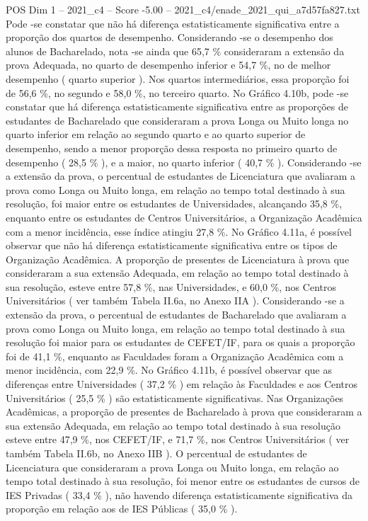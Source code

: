 \begin{textsample}{POS Dim 1 – 2021\_c4 – Score -5.00 – 2021\_c4/enade\_2021\_qui\_a7d57fa827.txt}
Pode -se constatar que não há diferença estatisticamente significativa entre a proporção dos quartos de desempenho.
Considerando -se o desempenho dos alunos de Bacharelado, nota -se ainda que 65,7 \% consideraram a extensão da prova Adequada, no quarto de desempenho inferior e 54,7 \%, no de melhor desempenho ( quarto superior ).
Nos quartos intermediários, essa proporção foi de 56,6 \%, no segundo e 58,0 \%, no terceiro quarto.
No Gráfico 4.10b, pode -se constatar que há diferença estatisticamente significativa entre as proporções de estudantes de Bacharelado que consideraram a prova Longa ou Muito longa no quarto inferior em relação ao segundo quarto e ao quarto superior de desempenho, sendo a menor proporção dessa resposta no primeiro quarto de desempenho ( 28,5 \% ), e a maior, no quarto inferior ( 40,7 \% ).
Considerando -se a extensão da prova, o percentual de estudantes de Licenciatura que avaliaram a prova como Longa ou Muito longa, em relação ao tempo total destinado à sua resolução, foi maior entre os estudantes de Universidades, alcançando 35,8 \%, enquanto entre os estudantes de Centros Universitários, a Organização Acadêmica com a menor incidência, esse índice atingiu 27,8 \%.
No Gráfico 4.11a, é possível observar que não há diferença estatisticamente significativa entre os tipos de Organização Acadêmica.
A proporção de presentes de Licenciatura à prova que consideraram a sua extensão Adequada, em relação ao tempo total destinado à sua resolução, esteve entre 57,8 \%, nas Universidades, e 60,0 \%, nos Centros Universitários ( ver também Tabela II.6a, no Anexo IIA ).
Considerando -se a extensão da prova, o percentual de estudantes de Bacharelado que avaliaram a prova como Longa ou Muito longa, em relação ao tempo total destinado à sua resolução foi maior para os estudantes de CEFET/IF, para os quais a proporção foi de 41,1 \%, enquanto as Faculdades foram a Organização Acadêmica com a menor incidência, com 22,9 \%.
No Gráfico 4.11b, é possível observar que as diferenças entre Universidades ( 37,2 \% ) em relação às Faculdades e aos Centros Universitários ( 25,5 \% ) são estatisticamente significativas.
Nas Organizações Acadêmicas, a proporção de presentes de Bacharelado à prova que consideraram a sua extensão Adequada, em relação ao tempo total destinado à sua resolução esteve entre 47,9 \%, nos CEFET/IF, e 71,7 \%, nos Centros Universitários ( ver também Tabela II.6b, no Anexo IIB ).
O percentual de estudantes de Licenciatura que consideraram a prova Longa ou Muito longa, em relação ao tempo total destinado à sua resolução, foi menor entre os estudantes de cursos de IES Privadas ( 33,4 \% ), não havendo diferença estatisticamente significativa da proporção em relação aos de IES Públicas ( 35,0 \% ).

\end{textsample}
